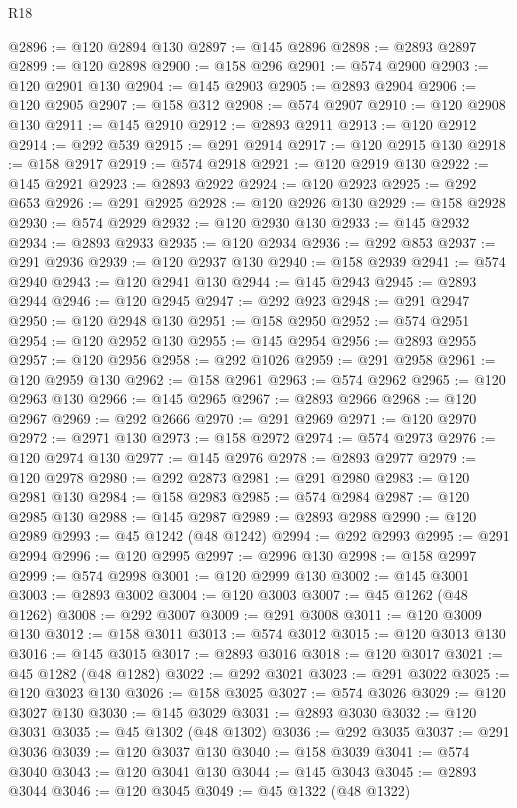 \begin{lexlean}{R18}
\begin{coremodule}
@2896 := @120 @2894 @130
@2897 := @145 @2896
@2898 := @2893 @2897
@2899 := @120 @2898
@2900 := @158 @296
@2901 := @574 @2900
@2903 := @120 @2901 @130
@2904 := @145 @2903
@2905 := @2893 @2904
@2906 := @120 @2905
@2907 := @158 @312
@2908 := @574 @2907
@2910 := @120 @2908 @130
@2911 := @145 @2910
@2912 := @2893 @2911
@2913 := @120 @2912
@2914 := @292 @539
@2915 := @291 @2914
@2917 := @120 @2915 @130
@2918 := @158 @2917
@2919 := @574 @2918
@2921 := @120 @2919 @130
@2922 := @145 @2921
@2923 := @2893 @2922
@2924 := @120 @2923
@2925 := @292 @653
@2926 := @291 @2925
@2928 := @120 @2926 @130
@2929 := @158 @2928
@2930 := @574 @2929
@2932 := @120 @2930 @130
@2933 := @145 @2932
@2934 := @2893 @2933
@2935 := @120 @2934
@2936 := @292 @853
@2937 := @291 @2936
@2939 := @120 @2937 @130
@2940 := @158 @2939
@2941 := @574 @2940
@2943 := @120 @2941 @130
@2944 := @145 @2943
@2945 := @2893 @2944
@2946 := @120 @2945
@2947 := @292 @923
@2948 := @291 @2947
@2950 := @120 @2948 @130
@2951 := @158 @2950
@2952 := @574 @2951
@2954 := @120 @2952 @130
@2955 := @145 @2954
@2956 := @2893 @2955
@2957 := @120 @2956
@2958 := @292 @1026
@2959 := @291 @2958
@2961 := @120 @2959 @130
@2962 := @158 @2961
@2963 := @574 @2962
@2965 := @120 @2963 @130
@2966 := @145 @2965
@2967 := @2893 @2966
@2968 := @120 @2967
@2969 := @292 @2666
@2970 := @291 @2969
@2971 := @120 @2970
@2972 := @2971 @130
@2973 := @158 @2972
@2974 := @574 @2973
@2976 := @120 @2974 @130
@2977 := @145 @2976
@2978 := @2893 @2977
@2979 := @120 @2978
@2980 := @292 @2873
@2981 := @291 @2980
@2983 := @120 @2981 @130
@2984 := @158 @2983
@2985 := @574 @2984
@2987 := @120 @2985 @130
@2988 := @145 @2987
@2989 := @2893 @2988
@2990 := @120 @2989
@2993 := @45 @1242 (@48 @1242)
@2994 := @292 @2993
@2995 := @291 @2994
@2996 := @120 @2995
@2997 := @2996 @130
@2998 := @158 @2997
@2999 := @574 @2998
@3001 := @120 @2999 @130
@3002 := @145 @3001
@3003 := @2893 @3002
@3004 := @120 @3003
@3007 := @45 @1262 (@48 @1262)
@3008 := @292 @3007
@3009 := @291 @3008
@3011 := @120 @3009 @130
@3012 := @158 @3011
@3013 := @574 @3012
@3015 := @120 @3013 @130
@3016 := @145 @3015
@3017 := @2893 @3016
@3018 := @120 @3017
@3021 := @45 @1282 (@48 @1282)
@3022 := @292 @3021
@3023 := @291 @3022
@3025 := @120 @3023 @130
@3026 := @158 @3025
@3027 := @574 @3026
@3029 := @120 @3027 @130
@3030 := @145 @3029
@3031 := @2893 @3030
@3032 := @120 @3031
@3035 := @45 @1302 (@48 @1302)
@3036 := @292 @3035
@3037 := @291 @3036
@3039 := @120 @3037 @130
@3040 := @158 @3039
@3041 := @574 @3040
@3043 := @120 @3041 @130
@3044 := @145 @3043
@3045 := @2893 @3044
@3046 := @120 @3045
@3049 := @45 @1322 (@48 @1322)

\end{coremodule}
\end{lexlean}
